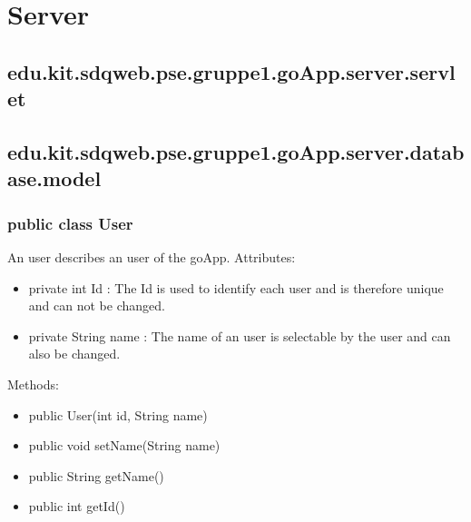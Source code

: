 
\section{Server}
	\subsection{edu.kit.sdqweb.pse.gruppe1.goApp.server.servlet}
	
	\subsection{edu.kit.sdqweb.pse.gruppe1.goApp.server.database.model}

	\subsubsection{public class User}
	An user describes an user of the goApp.
	\newline Attributes:
	\begin{itemize}
	\item private int Id : The Id is used to identify each user and is therefore unique and can not be changed.
	\item private String name : The name of an user is selectable by the user and can also be changed.
	\end{itemize}
	Methods: 
	\begin{itemize}
	\item public User(int id, String name)
	\item public void setName(String name)
	\item public String getName()
	\item public int getId()
	\end{itemize}

